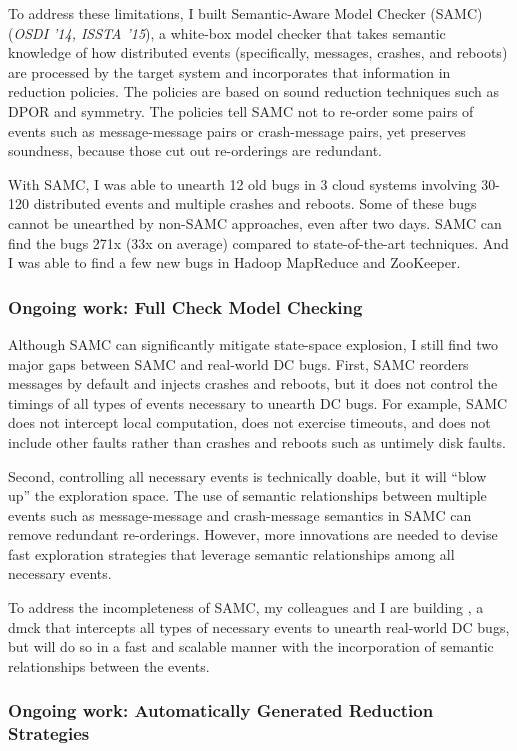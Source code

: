 \documentclass[11pt]{article}
\begin{document}
To address these limitations, I built Semantic-Aware Model Checker (SAMC)
(\textit{OSDI '14, ISSTA '15}), a white-box model checker that takes semantic
knowledge of how distributed events (specifically, messages, crashes, and
reboots) are processed by the target system and incorporates that information in
reduction policies. The policies are based on sound reduction techniques such as
DPOR and symmetry. The policies tell SAMC not to re-order some pairs of events
such as message-message pairs or crash-message pairs, yet preserves soundness,
because those cut out re-orderings are redundant.

With SAMC, I was able to unearth 12 old bugs in 3 cloud systems involving 30-120
distributed events and multiple crashes and reboots. Some of these bugs cannot
be unearthed by non-SAMC approaches, even after two days. SAMC can find the bugs
271x (33x on average) compared to state-of-the-art techniques. And I was able to
find a few new bugs in Hadoop MapReduce and ZooKeeper.

\subsubsection*{Ongoing work: Full Check Model Checking} 

Although SAMC can significantly mitigate state-space explosion, I still find two
major gaps between SAMC and real-world DC bugs. First, SAMC reorders messages by
default and injects crashes and reboots, but it does not control the timings of
all types of events necessary to unearth DC bugs. For example, SAMC does not
intercept local computation, does not exercise timeouts, and does not include
other faults rather than crashes and reboots such as untimely disk faults.

Second, controlling all necessary events is technically doable, but it will
``blow up'' the exploration space. The use of semantic relationships between
multiple events such as message-message and crash-message semantics in SAMC can
remove redundant re-orderings. However, more innovations are needed to devise
fast exploration strategies that leverage semantic relationships among all
necessary events.

To address the incompleteness of SAMC, my colleagues and I are building
\fullcheck, a dmck that intercepts all types of necessary events to unearth
real-world DC bugs, but will do so in a fast and scalable manner with the
incorporation of semantic relationships between the events.

\subsubsection*{Ongoing work: Automatically Generated Reduction Strategies} 
\end{document}
